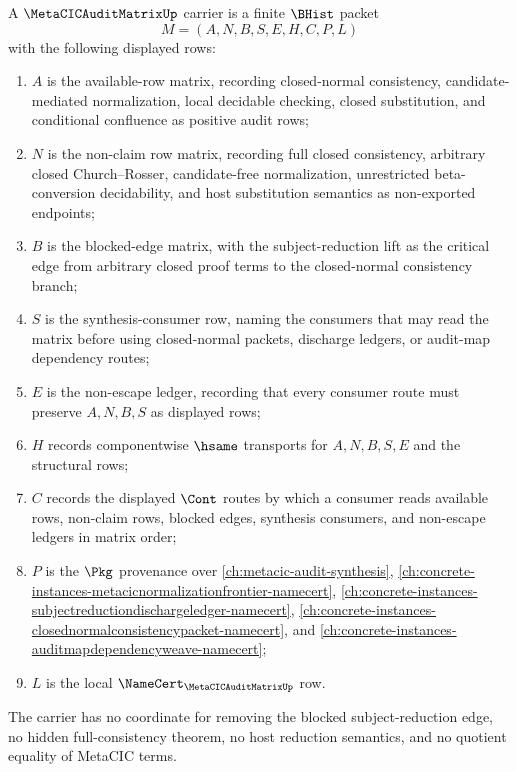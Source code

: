 \begin{definition}
\label{def:metacic-audit-matrix-carrier}
A $\MetaCICAuditMatrixUp$ carrier is a finite $\BHist$ packet
$$
M=(A,N,B,S,E,H,C,P,L)
$$
with the following displayed rows:
\begin{enumerate}
\item $A$ is the available-row matrix, recording closed-normal consistency, candidate-mediated normalization, local decidable checking, closed substitution, and conditional confluence as positive audit rows;
\item $N$ is the non-claim row matrix, recording full closed consistency, arbitrary closed Church--Rosser, candidate-free normalization, unrestricted beta-conversion decidability, and host substitution semantics as non-exported endpoints;
\item $B$ is the blocked-edge matrix, with the subject-reduction lift as the critical edge from arbitrary closed proof terms to the closed-normal consistency branch;
\item $S$ is the synthesis-consumer row, naming the consumers that may read the matrix before using closed-normal packets, discharge ledgers, or audit-map dependency routes;
\item $E$ is the non-escape ledger, recording that every consumer route must preserve $A,N,B,S$ as displayed rows;
\item $H$ records componentwise $\hsame$ transports for $A,N,B,S,E$ and the structural rows;
\item $C$ records the displayed $\Cont$ routes by which a consumer reads available rows, non-claim rows, blocked edges, synthesis consumers, and non-escape ledgers in matrix order;
\item $P$ is the $\Pkg$ provenance over \autoref{ch:metacic-audit-synthesis}, \autoref{ch:concrete-instances-metacicnormalizationfrontier-namecert}, \autoref{ch:concrete-instances-subjectreductiondischargeledger-namecert}, \autoref{ch:concrete-instances-closednormalconsistencypacket-namecert}, and \autoref{ch:concrete-instances-auditmapdependencyweave-namecert};
\item $L$ is the local $\NameCert_{\MetaCICAuditMatrixUp}$ row.
\end{enumerate}
The carrier has no coordinate for removing the blocked subject-reduction edge, no hidden full-consistency theorem, no host reduction semantics, and no quotient equality of MetaCIC terms.
\end{definition}

